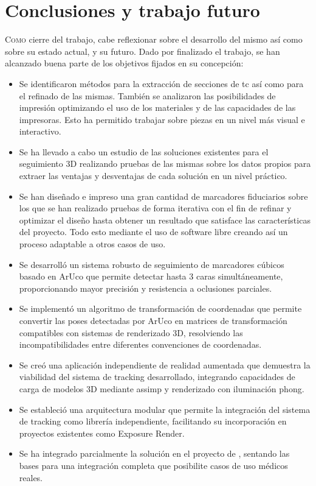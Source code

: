\chapter{Conclusiones y trabajo futuro}\label{chap:c}
\lettrine{C}{omo} cierre del trabajo, cabe reflexionar sobre el desarrollo del mismo así como sobre su estado actual, y su futuro. Dado por finalizado el trabajo, se han alcanzado buena parte de los objetivos fijados en su concepción:

\begin{itemize}
	\item Se identificaron métodos para la extracción de secciones de \acrshort{tc} así como para el refinado de las mismas. También se analizaron las posibilidades de impresión optimizando el uso de los materiales y de las capacidades de las impresoras. Esto ha permitido trabajar sobre piezas en un nivel más visual e interactivo.
	\item Se ha llevado a cabo un estudio de las soluciones existentes para el seguimiento 3D realizando pruebas de las mismas sobre los datos propios para extraer las ventajas y desventajas de cada solución en un nivel práctico.
	\item Se han diseñado e impreso una gran cantidad de marcadores fiduciarios sobre los que se han realizado pruebas de forma iterativa con el fin de refinar y optimizar el diseño hasta obtener un resultado que satisface las características del proyecto. Todo esto mediante el uso de software libre creando así un proceso adaptable a otros casos de uso.
	\item Se desarrolló un sistema robusto de seguimiento de marcadores cúbicos basado en ArUco que permite detectar hasta 3 caras simultáneamente, proporcionando mayor precisión y resistencia a oclusiones parciales.
	\item Se implementó un algoritmo de transformación de coordenadas que permite convertir las poses detectadas por ArUco en matrices de transformación compatibles con sistemas de renderizado 3D, resolviendo las incompatibilidades entre diferentes convenciones de coordenadas.
	\item Se creó una aplicación independiente de realidad aumentada que demuestra la viabilidad del sistema de tracking desarrollado, integrando capacidades de carga de modelos 3D mediante \acrshort{assimp} y renderizado con iluminación \gls{phong}.
	\item Se estableció una arquitectura modular que permite la integración del sistema de tracking como librería independiente, facilitando su incorporación en proyectos existentes como Exposure Render.
	\item Se ha integrado parcialmente la solución en el proyecto de \citeauthor{IglesiasGuitian2022}, sentando las bases para una integración completa que posibilite casos de uso médicos reales. 
\end{itemize}
